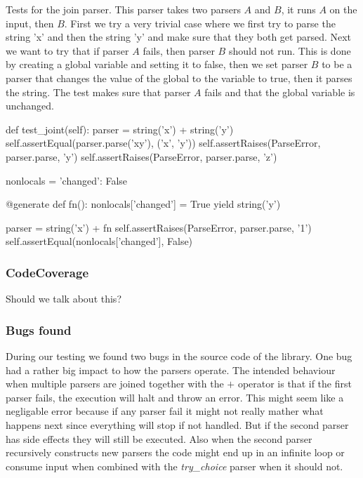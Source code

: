 Tests for the join parser. This parser takes two parsers $A$ and $B$, it runs $A$ on the input, then $B$. First we try a very trivial case where we first try to parse the string 'x' and then the string 'y' and make sure that they both get parsed. Next we want to try that if parser $A$ fails, then parser $B$ should not run. This is done by creating a global variable and setting it to false, then we set parser $B$ to be a parser that changes the value of the global to the variable to true, then it parses the string. The test makes sure that parser $A$ fails and that the global variable is unchanged.
\begin{python}[caption={Test case for the parser \textit{join}.}, label=test3]
def test_joint(self):
    parser = string('x') + string('y')
    self.assertEqual(parser.parse('xy'), ('x', 'y'))
    self.assertRaises(ParseError, parser.parse, 'y')
    self.assertRaises(ParseError, parser.parse, 'z')

    nonlocals = {'changed': False}

    @generate
    def fn():
        nonlocals['changed'] = True
        yield string('y')

    parser = string('x') + fn
    self.assertRaises(ParseError, parser.parse, '1')
    self.assertEqual(nonlocals['changed'], False)
\end{python}


\subsubsection{CodeCoverage}
Should we talk about this?

\subsubsection{Bugs found}
During our testing we found two bugs in the source code of the library. One bug had a rather big impact to how the parsers operate.
The intended behaviour when multiple parsers are joined together with the $+$ operator is that if the first parser fails, the execution will halt and throw an error.
This might seem like a negligable error because if any parser fail it might not really mather what happens next since everything will stop if not handled.
But if the second parser has side effects they will still be executed.
Also when the second parser recursively constructs new parsers the code might end up in an infinite loop or consume input when combined with the \textit{try\_choice} parser when it should not.

